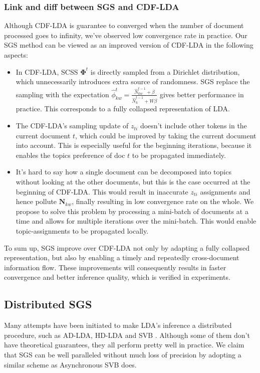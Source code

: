 \documentclass{article}
\begin{document}
\subsubsection{Link and diff between SGS and CDF-LDA}
Although CDF-LDA is guarantee to converged when the number of document processed goes to infinity, we've observed low convergence rate in practice. Our SGS method can be viewed as an improved version of CDF-LDA in the following aspects:
\begin{itemize}
\item In CDF-LDA, SCSS $\bm{\Phi}^t$ is directly sampled from a Dirichlet distribution, which unnecessarily introduces extra source of randomness. SGS replace the sampling with the expectation $\hat{\phi}_{kw}^t=\frac{\hat{N}_{kw}^{t-1}+\beta} {\hat{N}_k^{t-1}+W\beta}$ gives better performance in practice. This corresponds to a fully collapsed representation of LDA. 
\item The CDF-LDA's sampling update of $z_{ti}$ doesn't include other tokens in the current document $t$, which could be improved by taking the current document into account. This is especially useful for the beginning iterations, because it enables the topics preference of doc $t$ to be propagated immediately. 
\item It's hard to say how a single document can be decomposed into topics without looking at the other documents, but this is the case occurred at the beginning of CDF-LDA. This would result in inaccurate $z_{ti}$ assignments and hence pollute $\bm{N}_{kw}$, finally resulting in low convergence rate on the whole. We propose to solve this problem by processing a mini-batch of documents at a time and allows for multiple iterations over the mini-batch. This would enable topic-assignments to be propagated locally. 
\end{itemize}

To sum up, SGS improve over CDF-LDA not only by adapting a fully collapsed representation, but also by enabling a timely and repeatedly cross-document information flow. These improvements will consequently results in faster convergence and better inference quality, which is verified in experiments. 

\subsection{Distributed SGS}
Many attempts have been initiated to make LDA's inference a distributed procedure, such as AD-LDA, HD-LDA \cite{newman2007distributed} and SVB \cite{broderick2013streaming}. Although some of them don't have theoretical guarantees, they all perform pretty well in practice. We claim that SGS can be well paralleled without much loss of precision by adopting a similar scheme as Asynchronous SVB does. 
\end{document}
